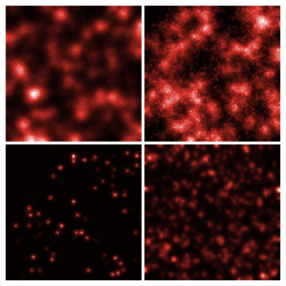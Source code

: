 \begin{figure}
\includegraphics[width=0.45\textwidth]{Figures/PartII/Modeling/UrbanGrowth/ex0}\hspace{0.5cm}
\includegraphics[width=0.45\textwidth]{Figures/PartII/Modeling/UrbanGrowth/ex1}\\
\medskip
\includegraphics[width=0.45\textwidth]{Figures/PartII/Modeling/UrbanGrowth/ex2}\hspace{0.5cm}
\includegraphics[width=0.45\textwidth]{Figures/PartII/Modeling/UrbanGrowth/ex3}\\\medskip

\end{figure}
